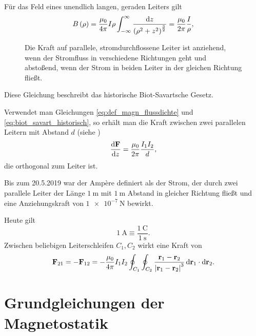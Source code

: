 Für das Feld eines unendlich langen, geraden Leiters gilt
\begin{equation}
	\label{eq:biot_savart_historisch}
	B\left(\rho \right)=\frac{\mu _{0}}{4\pi }I\rho \int _{-\infty }^{\infty }\frac{\mathop{}\!\mathrm{d} z}{\left(\rho ^{2}+z^{2}\right)^{\frac{3}{2}}}=\frac{\mu _{0}}{2\pi }\frac{I}{\rho },
\end{equation}


\begin{figure}[htb]
	\centering
	\tfigForceOnParallelConductors
	\caption{Die Kraft auf parallele, stromdurchflossene Leiter ist anziehend, wenn der Stromfluss in verschiedene Richtungen geht und abstoßend, wenn der Strom in beiden Leiter in der gleichen Richtung fließt. }
	\label{fig:force_parallel_conductors}
\end{figure}

Diese Gleichung beschreibt das historische Biot-Savartsche Gesetz.

Verwendet man Gleichungen \eqref{eq:def_magn_flussdichte} und \eqref{eq:biot_savart_historisch}, so erhält man die Kraft zwischen zwei parallelen Leitern mit Abstand $d$ (siehe )
\begin{equation*}
	\frac{\mathop{}\!\mathrm{d}\mathbf{F}}{\mathop{}\!\mathrm{d} z} = \frac{\mu_0}{2\pi} \frac{I_1I_2}d,
\end{equation*}
die orthogonal zum Leiter ist.

Bis zum 20.5.2019 war der Ampère definiert als der Strom, der durch zwei parallele Leiter der Länge $\SI{1}{\m}$ mit $\SI{1}{\m}$ Abstand in gleicher Richtung fließt und eine Anziehungskraft von $\SI{1e-7}{\newton}$ bewirkt.

Heute gilt
\begin{equation*}
	\SI{1}{\ampere}\equiv \frac{\SI{1}{\coulomb}}{\SI{1}{\s}}.
\end{equation*}
Zwischen beliebigen Leiterschleifen $C_{1},C_{2}$ wirkt eine Kraft von
\begin{equation*}
	\mathbf{F}_{21}=-\mathbf{F}_{12}=-\frac{\mu _{0}}{4\pi }I_{1}I_{2}\oint _{C_{1}}\oint _{C_{2}}\frac{\mathbf{r}_{1}-\mathbf{r}_{2}}{\left| \mathbf{r}_{1}-\mathbf{r}_{2}\right| ^{3}}\mathop{}\!\mathrm{d} \mathbf{r}_{1}\cdot \mathop{}\!\mathrm{d} \mathbf{r}_{2}.
\end{equation*}



\section{Grundgleichungen der Magnetostatik}


